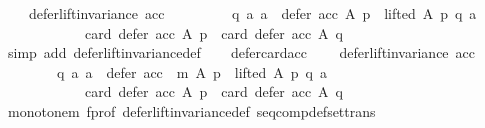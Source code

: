 \begin{isabellebody}
\ \ \ \ {\isachardoublequoteopen}defer{\isacharunderscore}{\kern0pt}lift{\isacharunderscore}{\kern0pt}invariance\ acc\ {\isasymlongrightarrow}\isanewline
\ \ \ \ \ \ \ \ {\isacharparenleft}{\kern0pt}{\isasymforall}q\ a{\isachardot}{\kern0pt}\ {\isacharparenleft}{\kern0pt}a\ {\isasymin}\ {\isacharparenleft}{\kern0pt}defer\ {\isacharparenleft}{\kern0pt}acc{\isacharparenright}{\kern0pt}\ A\ p{\isacharparenright}{\kern0pt}\ {\isasymand}\ lifted\ A\ p\ q\ a{\isacharparenright}{\kern0pt}\ {\isasymlongrightarrow}\isanewline
\ \ \ \ \ \ \ \ \ \ \ \ card\ {\isacharparenleft}{\kern0pt}defer\ {\isacharparenleft}{\kern0pt}acc{\isacharparenright}{\kern0pt}\ A\ p{\isacharparenright}{\kern0pt}\ {\isacharequal}{\kern0pt}\ card\ {\isacharparenleft}{\kern0pt}defer\ {\isacharparenleft}{\kern0pt}acc{\isacharparenright}{\kern0pt}\ A\ q{\isacharparenright}{\kern0pt}{\isacharparenright}{\kern0pt}{\isachardoublequoteclose}\isanewline
\ \ \ \ \isamarkupfalse%
\ {\isacharparenleft}{\kern0pt}simp\ add{\isacharcolon}{\kern0pt}\ defer{\isacharunderscore}{\kern0pt}lift{\isacharunderscore}{\kern0pt}invariance{\isacharunderscore}{\kern0pt}def{\isacharparenright}{\kern0pt}\isanewline
\ \ \isamarkupfalse%
\ defer{\isacharunderscore}{\kern0pt}card{\isacharunderscore}{\kern0pt}acc{\isacharunderscore}{\kern0pt}{}{\isacharcolon}{\kern0pt}\isanewline
\ \ \ \ {\isachardoublequoteopen}defer{\isacharunderscore}{\kern0pt}lift{\isacharunderscore}{\kern0pt}invariance\ acc\ {\isasymlongrightarrow}\isanewline
\ \ \ \ \ \ \ \ {\isacharparenleft}{\kern0pt}{\isasymforall}q\ a{\isachardot}{\kern0pt}\ {\isacharparenleft}{\kern0pt}a\ {\isasymin}\ {\isacharparenleft}{\kern0pt}defer\ {\isacharparenleft}{\kern0pt}acc\ {\isasymtriangleright}\ m{\isacharparenright}{\kern0pt}\ A\ p{\isacharparenright}{\kern0pt}\ {\isasymand}\ lifted\ A\ p\ q\ a{\isacharparenright}{\kern0pt}\ {\isasymlongrightarrow}\isanewline
\ \ \ \ \ \ \ \ \ \ \ \ card\ {\isacharparenleft}{\kern0pt}defer\ {\isacharparenleft}{\kern0pt}acc{\isacharparenright}{\kern0pt}\ A\ p{\isacharparenright}{\kern0pt}\ {\isacharequal}{\kern0pt}\ card\ {\isacharparenleft}{\kern0pt}defer\ {\isacharparenleft}{\kern0pt}acc{\isacharparenright}{\kern0pt}\ A\ q{\isacharparenright}{\kern0pt}{\isacharparenright}{\kern0pt}{\isachardoublequoteclose}\isanewline
\ \ \ \ \isamarkupfalse%
\ monotone{\isacharunderscore}{\kern0pt}m\ f{\isacharunderscore}{\kern0pt}prof\ defer{\isacharunderscore}{\kern0pt}lift{\isacharunderscore}{\kern0pt}invariance{\isacharunderscore}{\kern0pt}def\ seq{\isacharunderscore}{\kern0pt}comp{\isacharunderscore}{\kern0pt}def{\isacharunderscore}{\kern0pt}set{\isacharunderscore}{\kern0pt}trans\isanewline

\end{isabellebody}
